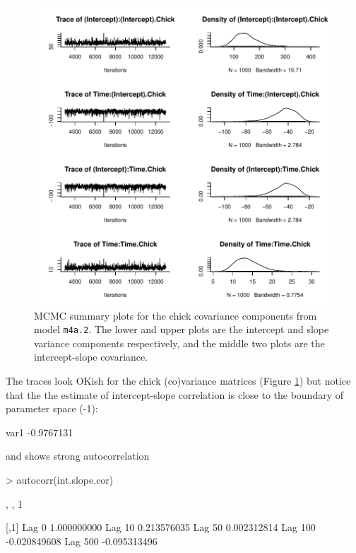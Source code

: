 \documentclass{article}
\begin{document}
\begin{figure}[!h]
\begin{center}
\includegraphics{Lecture4-017}
\end{center}
\caption{MCMC summary plots for the chick covariance components from model \texttt{m4a.2}. The lower and upper plots are the intercept and slope variance components respectively, and the middle two plots are the intercept-slope covariance.}
\label{RR2VCV-fig}
\end{figure}

The traces look OKish for the chick (co)variance matrices (Figure \ref{RR2VCV-fig}) but notice that the the estimate of intercept-slope correlation is close to the boundary of parameter space (-1):

\begin{Schunk}
\begin{Soutput}
      var1 
-0.9767131 
\end{Soutput}
\end{Schunk}

and shows strong autocorrelation

\begin{Schunk}
\begin{Sinput}
> autocorr(int.slope.cor)
\end{Sinput}
\begin{Soutput}
, , 1

                [,1]
Lag 0    1.000000000
Lag 10   0.213576035
Lag 50   0.002312814
Lag 100 -0.020849608
Lag 500 -0.095313496
\end{Soutput}
\end{Schunk}
\end{document}

